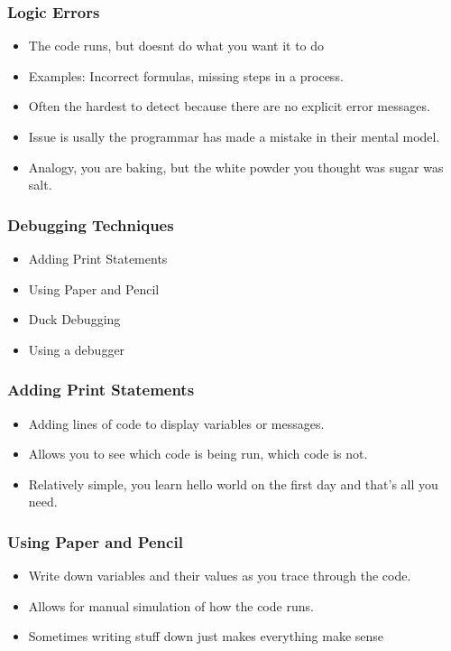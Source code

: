 \documentclass[aspectratio=169,hyperref={unicode}]{beamer}
\begin{document}
\begin{frame}
\frametitle{Logic Errors}
\begin{itemize}
\item The code runs, but doesnt do what you want it to do
\item Examples: Incorrect formulas, missing steps in a process.
\item Often the hardest to detect because there are no explicit error messages.
        \item Issue is usally the programmar has made a mistake in their mental model.
        \item Analogy, you are baking, but the white powder you thought was sugar was salt.
\end{itemize}
\end{frame}

\begin{frame}
\frametitle{Debugging Techniques}
\begin{itemize}
\item Adding Print Statements
\item Using Paper and Pencil
\item Duck Debugging
        \item Using a debugger
\end{itemize}
\end{frame}

\begin{frame}
\frametitle{Adding Print Statements}
\begin{itemize}
\item Adding lines of code to display variables or messages.
  \item Allows you to see which code is being run, which code is not.
    \item  Relatively simple, you learn hello world on the first day and that's all you need.
\end{itemize}
\end{frame}

\begin{frame}
\frametitle{Using Paper and Pencil}
\begin{itemize}
\item Write down variables and their values as you trace through the code.
\item Allows for manual simulation of how the code runs.
\item Sometimes writing stuff down just makes everything make sense
\end{itemize}
\end{frame}
\end{document}

